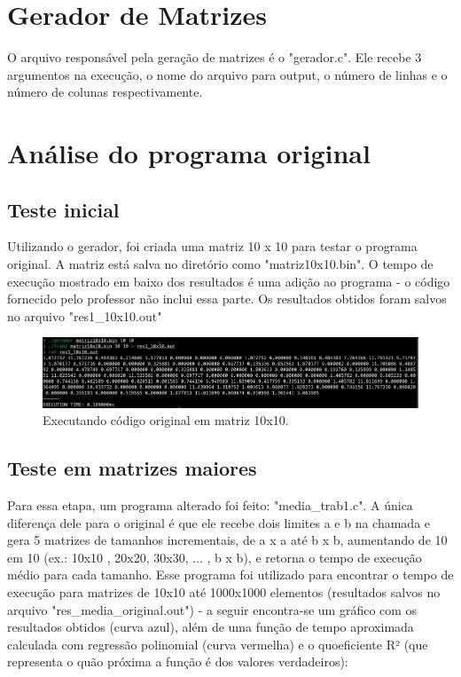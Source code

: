 \section{\esp Gerador de Matrizes}
O arquivo responsável pela geração de matrizes é o "gerador.c". Ele recebe 3 argumentos na execução, o nome do arquivo para output, o número de linhas e o número de colunas respectivamente.

\section{\esp Análise do programa original}
\subsection{\esp Teste inicial}
Utilizando o gerador, foi criada uma matriz 10 x 10 para testar o programa original. A matriz está salva no diretório como "matriz10x10.bin". O tempo de execução mostrado em baixo dos resultados é uma adição ao programa - o código fornecido pelo professor não inclui essa parte. Os resultados obtidos foram salvos no arquivo "res1\_10x10.out"

\begin{figure}[!ht]
	\centering	
	\caption[\hspace{0.1cm}Executando código original em matriz 10x10.]{Executando código original em matriz 10x10.}
	  \vspace{-0.4cm}
	\includegraphics[width=.8\textwidth]{figuras/img1.png}
\end{figure}

\subsection{\esp Teste em matrizes maiores}
Para essa etapa, um programa alterado foi feito: "media\_trab1.c". A única diferença dele para o original é que ele recebe dois limites a e b na chamada e gera  5 matrizes de tamanhos incrementais, de a x a até b x b, aumentando de 10 em 10 (ex.: 10x10 , 20x20, 30x30, ... , b x b), e retorna o tempo de execução médio para cada tamanho. Esse programa foi utilizado para encontrar o tempo de execução para matrizes de 10x10 até 1000x1000 elementos (resultados salvos no arquivo "res\_media\_original.out") - a seguir encontra-se um gráfico com os resultados obtidos (curva azul), além de uma função de tempo aproximada calculada com regressão polinomial (curva vermelha) e o quoeficiente R² (que representa o quão próxima a função é dos valores verdadeiros):


